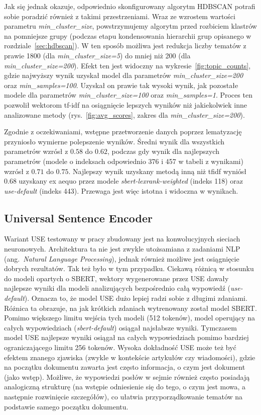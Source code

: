 		Jak się jednak okazuje, odpowiednio skonfigurowany algorytm HDBSCAN potrafi sobie poradzić również z takimi przestrzeniami.
		Wraz ze wzrostem wartości parametru \emph{min\_cluster\_size}, powstrzymujemy algorytm przed rozbiciem klastrów na pomniejsze grupy
			(podczas etapu kondensowania hierarchii grup opisanego w rozdziale~\ref{sec:hdbscan}).
		W ten sposób możliwa jest redukcja liczby tematów z prawie 1800 (dla \emph{min\_cluster\_size=5}) do mniej niż 200 (dla \emph{min\_cluster\_size=200}).
		Efekt ten jest widoczny na wykresie~\ref{fig:topic_counts}, gdzie najwyższy wynik uzyskał model dla parametrów \emph{min\_cluster\_size=200} oraz \emph{min\_samples=100}.
		Uzyskał on prawie tak wysoki wynik, jak pozostałe modele dla parametrów \emph{min\_cluster\_size=100} oraz \emph{min\_samples=1}.
		Proces ten pozwolił wektorom tf-idf na osiągnięcie lepszych wyników niż jakiekolwiek inne analizowane metody (rys.~\ref{fig:avg_scores}, zakres dla \emph{min\_cluster\_size=200}).

		Zgodnie z oczekiwaniami, wstępne przetworzenie danych poprzez lematyzację przyniosło wymierne polepszenie wyników.
		Średni wynik dla wszystkich parametrów wzrósł z \(0.58\) do \(0.62\),
			podczas gdy wynik dla najlepszych parametrów (modele o indeksach odpowiednio 376 i 457 w tabeli z wynikami) wzrósł z \(0.71\) do \(0.75\).
		Najlepszy wynik uzyskany metodą inną niż tfidf wyniósł \(0.68\) uzyskany ex aequo przez modele \emph{sbert-lexrank-weighted} (indeks 118) oraz \emph{use-default} (indeks 443).
		Przewaga jest więc istotna i widoczna w wynikach.
		
	\subsection{Universal Sentence Encoder}
		Wariant USE testowany w pracy zbudowany jest na konwolucyjnych sieciach neuronowych.
		Architektura ta nie jest zwykle utożsamiana z zadaniami NLP (ang.\ \emph{Natural Language Processing}), jednak również możliwe jest osiągnięcie dobrych rezultatów.
		Tak też było w tym przypadku.
		Ciekawą różnicą w stosunku do modeli opartych o SBERT, wektory wygenerowane przez USE dawały najlepsze wyniki dla modeli analizujących bezpośrednio całą wypowiedź (\emph{use-default}).
		Oznacza to, że model USE dużo lepiej radzi sobie z długimi zdaniami.
		Różnica ta obrazuje, na jak krótkich zdaniach wytrenowany został model SBERT.
		Pomimo większego limitu wejścia tych modeli (512 tokenów), model operujący na całych wypowiedziach (\emph{sbert-default}) osiągał najsłabsze wyniki.
		Tymczasem model USE najlepsze wyniki osiągał na całych wypowiedziach pomimo bardziej ograniczającego limitu 256 tokenów.
		Wysoka dokładność USE może też być efektem znanego zjawiska (zwykle w kontekście artykułów czy wiadomości),
			gdzie na początku dokumentu zawarta jest często informacja, o czym jest dokument (jako wstęp).
		Możliwe, że wypowiedzi posłów w sejmie również często posiadają analogiczną strukturę
			(na wstępie odniesienie się do tego, o czym jest mowa, a następnie rozwinięcie szczegółów), co ułatwia przyporządkowanie tematów na podstawie samego początku dokumentu.

